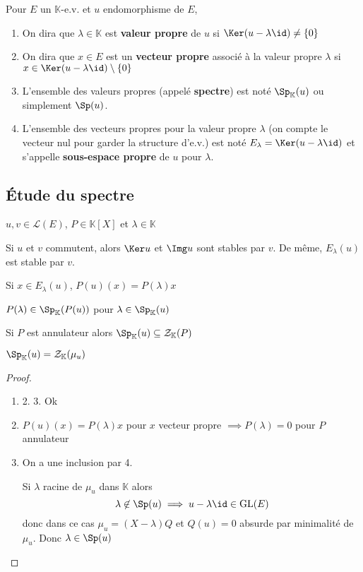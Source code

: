 \begin{dfn}
    Pour $E$ un $\mathbb K$-e.v. et $u$ endomorphisme de $E$, \begin{enumerate}
        \item On dira que $\lambda\in\mathbb K$ est \textbf{valeur propre} de $u$ si $\Ker(u-\lambda\id)\neq \{0\}$
        \item On dira que $x\in E$ est un \textbf{vecteur propre} associé à la valeur propre $\lambda$ si $x\in\Ker(u-\lambda\id)\setminus\{0\}$
        \item L'ensemble des valeurs propres (appelé \textbf{spectre}) est noté $\Sp_{\mathbb K}(u)$ ou simplement $\Sp(u)$.
        \item L'ensemble des vecteurs propres pour la valeur propre $\lambda$ (on compte le vecteur nul pour garder la structure d'e.v.) est noté $E_\lambda=\Ker(u-\lambda \id)$ et s'appelle \textbf{sous-espace propre} de $u$ pour $\lambda$.
    \end{enumerate}
\end{dfn}

\subsection{Étude du spectre}

\begin{prop}
    \Hyp $u, v\in\mathcal L(E)$, $P\in\mathbb K[X]$ et $\lambda\in\mathbb K$
    \begin{concenum}
    \item Si $u$ et $v$ commutent, alors $\Ker u$ et $\Img u$ sont stables par $v$. De même, $E_\lambda(u)$ est stable par $v$.
    \item Si $x\in E_\lambda(u)$, $P(u)(x)=P(\lambda)x$
    \item $P(\lambda)\in\Sp_{\mathbb K}(P(u))$ pour $\lambda\in \Sp_{\mathbb K}(u)$
    \item Si $P$ est annulateur alors $\Sp_{\mathbb K}(u)\subseteq \mathcal Z_{\mathbb K}(P)$
    \item $\Sp_{\mathbb K}(u)=\mathcal Z_{\mathbb K}(\mu_u)$
    \end{concenum}
\end{prop}

\begin{proof}~ \begin{enumerate}
    \item 2. 3. Ok
    \setcounter{enumi}{3}
    \item $P(u)(x)=P(\lambda)x$ pour $x$ vecteur propre $\implies P(\lambda) = 0$ pour $P$ annulateur
    \item On a une inclusion par 4.

        Si $\lambda$ racine de $\mu_u$ dans $\mathbb K$ alors \[ \lambda \not\in\Sp(u)\implies u-\lambda\id \in \mathrm{GL}(E)
        \]
        donc dans ce cas $\mu_u=(X-\lambda) Q$ et $Q(u)=0$ absurde par minimalité de $\mu_u$. Donc $\lambda\in\Sp(u)$
\end{enumerate}
\end{proof}

